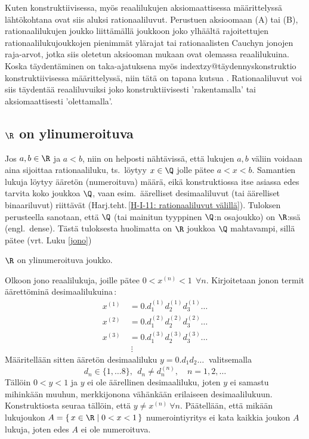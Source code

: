 Kuten konstruktiivisessa, myös reaalilukujen aksiomaattisessa määrittelyssä lähtökohtana ovat 
siis aluksi rationaaliluvut. Perustuen aksioomaan (A) tai (B), rationaalilukujen joukko 
 liittämällä joukkoon joko ylhäältä rajoitettujen rationaalilukujoukkojen 
pienimmät ylärajat tai rationaalisten Cauchyn jonojen raja-arvot, jotka siis oletetun aksiooman
mukaan ovat olemassa reaalilukuina. Koska täydentäminen on taka-ajatuksena myös
index{tzy@täydennyskonstruktio}%
konstruktiivisessa määrittelyssä, niin tätä on tapana kutsua .
Rationaaliluvut voi siis täydentää reaaliluvuiksi joko konstruktiivisesti 'rakentamalla' tai
aksiomaattisesti 'olettamalla'.

\subsection*{$\R$ on ylinumeroituva}
%

Jos $a,b \in \R$ ja $a<b$, niin on helposti nähtävissä, että lukujen $a,b$ väliin voidaan aina
sijoittaa rationaaliluku, ts.\ löytyy $x \in \Q$ jolle pätee $a<x<b$. Samantien lukuja löytyy
ääretön (numeroituva) määrä, eikä konstruktiossa itse asiassa edes tarvita koko joukkoa $\Q$,
vaan esim.\ äärelliset desimaaliluvut (tai äärelliset binaariluvut) riittävät
(Harj.teht.\,\ref{H-I-11: rationaaliluvut välillä}). Tuloksen perusteella sanotaan, että $\Q$
%
(tai mainitun tyyppinen $\Q$:n osajoukko) on $\R$:ssä  (engl.\ dense). Tästä 
tuloksesta huolimatta on $\R$ joukkoa $\Q$ mahtavampi, sillä pätee (vrt. Luku \ref{jono})
\begin{Lause} \label{R on ylinumeroituva} $\R$ on ylinumeroituva joukko. 
\end{Lause}
\tod Olkoon  jono reaalilukuja, joille pätee $0 < x^{(n)} < 1\ \ \forall n$. 
Kirjoitetaan jonon termit äärettöminä desimaalilukuina\,:
\begin{align*}
x^{(1)}\ &= 0.d_1^{(1)}d_2^{(1)}d_3^{(1)} \ldots \\
x^{(2)}\ &= 0.d_1^{(2)}d_2^{(2)}d_3^{(2)} \ldots \\
x^{(3)}\ &= 0.d_1^{(3)}d_2^{(3)}d_3^{(3)} \ldots \\
          &\ \vdots
\end{align*}
Määritellään sitten ääretön desimaaliluku $y = 0.d_1d_2 \ldots\ $ valitsemalla 
\[
d_n \in \{1,\ldots 8\},\ \ d_n \neq d_n^{(n)}, \quad n = 1,2, \ldots
\] 
Tällöin $0<y<1$ ja $y$ ei ole äärellinen desimaaliluku, joten $y$ ei samastu mihinkään muuhun,
merkkijonona vähänkään erilaiseen desimaalilukuun. Konstruktiosta seuraa tällöin, että 
$y \neq x^{(n)}\ \forall n$. Päätellään, että mikään lukujoukon 
$A = \{\,x \in \R \mid 0<x<1\,\}$ numerointiyritys ei kata kaikkia joukon $A$ lukuja, joten 
edes $A$ ei ole numeroituva. \loppu

